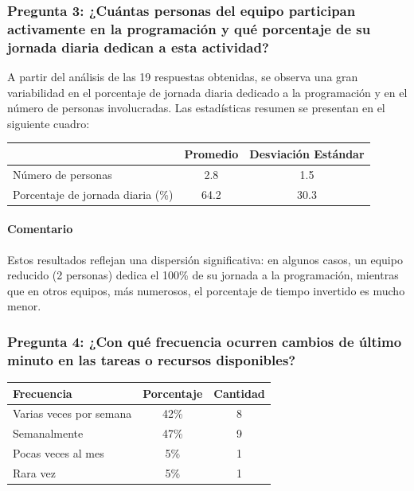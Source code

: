 \documentclass{article}
\begin{document}
\begin{appendix}
    \vspace{1.5em}
    \subsubsection*{Pregunta 3: ¿Cuántas personas del equipo participan activamente en la programación y qué porcentaje de su jornada diaria dedican a esta actividad?}
    
    A partir del análisis de las 19 respuestas obtenidas, se observa una gran variabilidad en el porcentaje de jornada diaria dedicado a la programación y en el número de personas involucradas. Las estadísticas resumen se presentan en el siguiente cuadro:
    
    \begin{table}[htbp]
        \centering
        \begin{tabular}{lcc}
            \toprule
            & \textbf{Promedio} & \textbf{Desviación Estándar} \\
            \midrule
            Número de personas & 2.8 & 1.5 \\
            Porcentaje de jornada diaria (\%) & 64.2 & 30.3 \\
            \bottomrule
        \end{tabular}
        \label{tab:estadisticas_resumen_jornada}
    \end{table}
    
    \paragraph{Comentario} Estos resultados reflejan una dispersión significativa: en algunos casos, un equipo reducido (2 personas) dedica el 100\% de su jornada a la programación, mientras que en otros equipos, más numerosos, el porcentaje de tiempo invertido es mucho menor.
    
    
    \vspace{1.5em}
    \subsubsection*{Pregunta 4: ¿Con qué frecuencia ocurren cambios de último minuto en las tareas o recursos disponibles?}
    
    \begin{table}[htbp]
        \centering
        \begin{tabular}{lcc}
            \toprule
            \textbf{Frecuencia} & \textbf{Porcentaje} & \textbf{Cantidad} \\
            \midrule
            Varias veces por semana & 42\% & 8 \\
            Semanalmente & 47\% & 9 \\
            Pocas veces al mes & 5\% & 1 \\
            Rara vez & 5\% & 1 \\
            \bottomrule
        \end{tabular}
        \label{tab:cambios_ultimo_minuto}
    \end{table}
    

\end{appendix}
\end{document}
